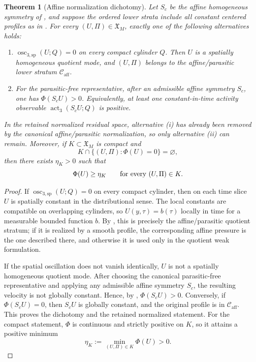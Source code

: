 \documentclass[11pt]{amsart}
\numberwithin{equation}{section}
\theoremstyle{plain}
\newtheorem{theorem}{Theorem}[section]
\theoremstyle{definition}
\theoremstyle{remark}
\newcommand{\Caff}{\mathcal C_{\mathrm{aff}}}
\newcommand{\oscsp}{\operatorname{osc}_{3,\mathrm{sp}}}
\newcommand{\actthree}{\operatorname{act}_3}
\begin{document}
\begin{theorem}[Affine normalization dichotomy]
\label{thm:affine-normalization-dichotomy}
Let \(S_c\) be the affine homogeneous symmetry of
, and suppose the ordered lower strata include all
constant centered profiles as in .
For every \((U,\Pi)\in\mathfrak X_M\), exactly one of the following alternatives
holds:
\begin{enumerate}[label=\textup{(\roman*)}]
   \item \(\oscsp(U;Q)=0\) on every compact cylinder \(Q\).  Then \(U\) is a
   spatially homogeneous quotient mode, and \((U,\Pi)\) belongs to the
   affine/parasitic lower stratum \(\Caff\).
   \item For the parasitic-free representative, after an admissible affine
   symmetry \(S_c\), one has \(\Phi(S_cU)>0\).  Equivalently, at least one
   constant-in-time activity observable \(\actthree(S_cU;Q)\) is positive.
\end{enumerate}
In the retained normalized residual space, alternative \textup{(i)} has already
been removed by the canonical affine/parasitic normalization, so only
alternative \textup{(ii)} can remain.
Moreover, if \(K\subset\mathfrak X_M\) is compact and
\[
   K\cap\{(U,\Pi):\Phi(U)=0\}=\varnothing ,
\]
then there exists \(\eta_K>0\) such that
\[
   \Phi(U)\ge\eta_K
   \qquad\hbox{for every }(U,\Pi)\in K .
\]
\end{theorem}

\begin{proof}
If \(\oscsp(U;Q)=0\) on every compact cylinder, then on each time slice \(U\) is
spatially constant in the distributional sense.  The local constants are
compatible on overlapping cylinders, so \(U(y,\tau)=b(\tau)\) locally in time
for a measurable bounded function \(b\).  By
, this is precisely the
affine/parasitic quotient stratum; if it is realized by a smooth profile, the
corresponding affine pressure is the one described there, and otherwise it is
used only in the quotient weak formulation.

If the spatial oscillation does not vanish identically, \(U\) is not a
spatially homogeneous quotient mode.  After choosing the canonical
parasitic-free representative and applying any admissible affine symmetry
\(S_c\), the resulting velocity is not globally constant.  Hence, by
, \(\Phi(S_cU)>0\).  Conversely,
if \(\Phi(S_cU)=0\), then \(S_cU\) is globally constant, and the original
profile is in \(\Caff\).  This proves the dichotomy and the retained normalized
statement.  For the compact statement, \(\Phi\) is continuous and
strictly positive on \(K\), so it attains a positive minimum
\[
   \eta_K:=\min_{(U,\Pi)\in K}\Phi(U)>0 .
\]
\end{proof}
\end{document}
